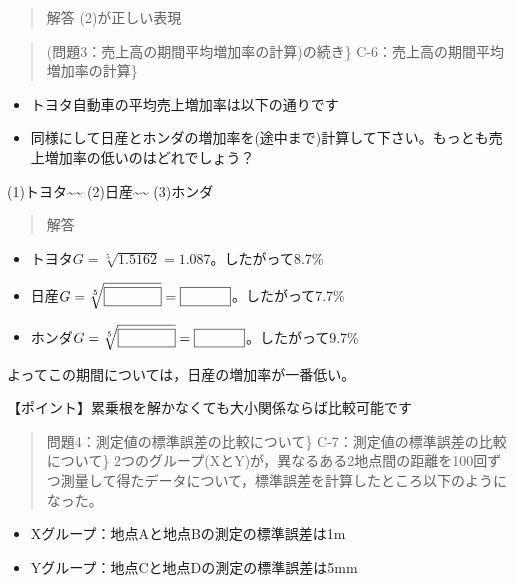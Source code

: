 \documentclass[
]{book}
\providecommand{\tightlist}{%
  \setlength{\itemsep}{0pt}\setlength{\parskip}{0pt}}
\theoremstyle{definition}
\theoremstyle{definition}
\theoremstyle{definition}
\theoremstyle{definition}
\theoremstyle{remark}
\begin{document}
\begin{quote}
解答
(2)が正しい表現
\end{quote}

\begin{quote}
(問題3：売上高の期間平均増加率の計算)の続き\}
C-6：売上高の期間平均増加率の計算\}
\end{quote}

\begin{itemize}
\tightlist
\item
  トヨタ自動車の平均売上増加率は以下の通りです
\end{itemize}

\begin{itemize}
\tightlist
\item
  同様にして日産とホンダの増加率を(途中まで)計算して下さい。もっとも売上増加率の低いのはどれでしょう？
\end{itemize}

(1)トヨタ\textasciitilde\textasciitilde{}
(2)日産\textasciitilde\textasciitilde{}
(3)ホンダ

\begin{quote}
解答
\end{quote}

\begin{itemize}
\tightlist
\item
  トヨタ\(G=\sqrt[5]{1.5162}=1.087\)。したがって8.7\%
\item
  日産\(G=\sqrt[5]{\fbox{\phantom{~1.4498~}}}=\fbox{\phantom{~1.077~}}\)。したがって7.7\%
\item
  ホンダ\(G=\sqrt[5]{\fbox{\phantom{~1.5870~}}}=\fbox{\phantom{~1.097~}}\)。したがって9.7\%
\end{itemize}

よってこの期間については，日産の増加率が一番低い。

【ポイント】累乗根を解かなくても大小関係ならば比較可能です

\begin{quote}
問題4：測定値の標準誤差の比較について\}
C-7：測定値の標準誤差の比較について\}
2つのグループ(XとY)が，異なるある2地点間の距離を100回ずつ測量して得たデータについて，標準誤差を計算したところ以下のようになった。
\end{quote}

\begin{itemize}
\tightlist
\item
  Xグループ：地点Aと地点Bの測定の標準誤差は1m
\item
  Yグループ：地点Cと地点Dの測定の標準誤差は5mm
\end{itemize}
\end{document}
